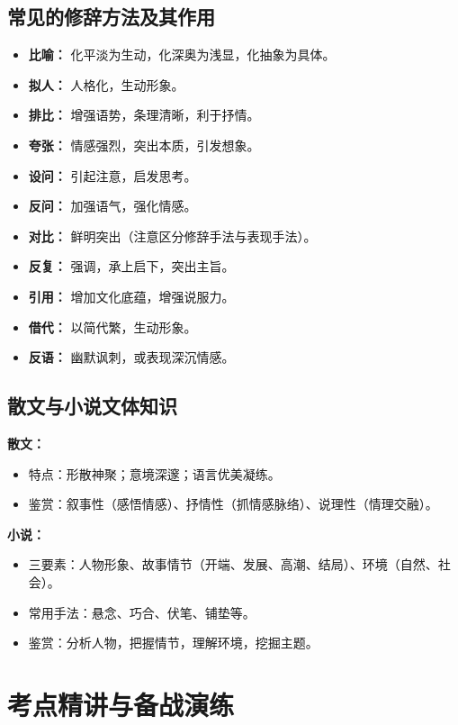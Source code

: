 \documentclass[11pt, a4paper]{ctexart}
\begin{document}
\subsection{常见的修辞方法及其作用}
\begin{itemize}
    \item \textbf{比喻：} 化平淡为生动，化深奥为浅显，化抽象为具体。
    \item \textbf{拟人：} 人格化，生动形象。
    \item \textbf{排比：} 增强语势，条理清晰，利于抒情。
    \item \textbf{夸张：} 情感强烈，突出本质，引发想象。
    \item \textbf{设问：} 引起注意，启发思考。
    \item \textbf{反问：} 加强语气，强化情感。
    \item \textbf{对比：} 鲜明突出（注意区分修辞手法与表现手法）。
    \item \textbf{反复：} 强调，承上启下，突出主旨。
    \item \textbf{引用：} 增加文化底蕴，增强说服力。
    \item \textbf{借代：} 以简代繁，生动形象。
    \item \textbf{反语：} 幽默讽刺，或表现深沉情感。
\end{itemize}

\subsection{散文与小说文体知识}
\textbf{散文：}
\begin{itemize}
    \item 特点：形散神聚；意境深邃；语言优美凝练。
    \item 鉴赏：叙事性（感悟情感）、抒情性（抓情感脉络）、说理性（情理交融）。
\end{itemize}

\textbf{小说：}
\begin{itemize}
    \item 三要素：人物形象、故事情节（开端、发展、高潮、结局）、环境（自然、社会）。
    \item 常用手法：悬念、巧合、伏笔、铺垫等。
    \item 鉴赏：分析人物，把握情节，理解环境，挖掘主题。
\end{itemize}

\section{考点精讲与备战演练}
\end{document}
